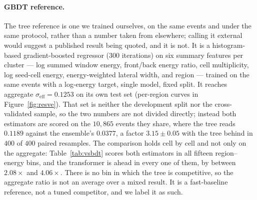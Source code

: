 \documentclass[11pt,a4paper]{article}
\newcommand{\seff}{\ensuremath{\sigma_{\mathrm{eff}}}}
\begin{document}
\paragraph{GBDT reference.} The tree reference is one we trained ourselves, on
the same events and under the same protocol, rather than a number taken from
elsewhere; calling it external would suggest a published result being quoted,
and it is not. It is a
histogram-based gradient-boosted regressor (300 iterations) on six summary
features per cluster --- log summed window energy, front/back energy ratio,
cell multiplicity, log seed-cell energy, energy-weighted lateral width, and
region --- trained on the same events with a log-energy target, single model,
fixed split. It reaches aggregate $\seff = 0.1253$ on its own test set
(per-region curves in Figure~\ref{fig:resve}). That set is neither the
development split nor the cross-validated sample, so the two numbers are not
divided directly; instead both estimators are scored on the $10{,}865$ events
they share, where the tree reads $0.1189$ against the ensemble's $0.0377$, a
factor $3.15 \pm 0.05$ with the tree behind in $400$ of $400$ paired
resamples. The comparison holds cell by cell and not only on the
aggregate: Table~\ref{tab:vsbdt} scores both estimators in all fifteen
region--energy bins, and the transformer is ahead in every one of them, by
between $2.08\times$ and $4.06\times$. There is no bin in which the tree is
competitive, so the aggregate ratio is not an average over a mixed result.
It is a fast-baseline reference,
not a tuned competitor, and we label it as such.
\end{document}
